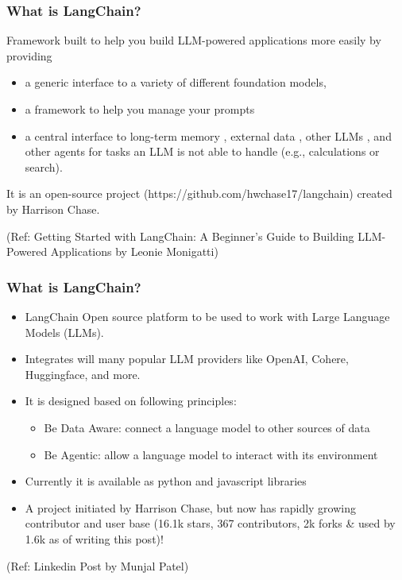 \begin{frame}[fragile]\frametitle{What is LangChain?}

Framework built to help you build LLM-powered applications more easily by providing 

\begin{itemize}
\item a generic interface to a variety of different foundation models,
\item a framework to help you manage your prompts 
\item a central interface to long-term memory , external data , other LLMs , and other agents for tasks an LLM is not able to handle (e.g., calculations or search).
\end{itemize}

It is an open-source project (https://github.com/hwchase17/langchain) created by Harrison Chase.

{\tiny (Ref: Getting Started with LangChain: A Beginner’s Guide to Building LLM-Powered Applications by Leonie Monigatti)}
\end{frame}



\begin{frame}\frametitle{What is LangChain?}

\begin{itemize}
\item LangChain Open source platform to be used to work with Large Language Models (LLMs). 
\item Integrates will many popular LLM providers like OpenAI, Cohere, Huggingface, and more.  
\item It is designed based on following principles:
	\begin{itemize}
	\item Be Data Aware: connect a language model to other sources of data
	\item Be Agentic: allow a language model to interact with its environment
	\end{itemize}
\item Currently it is available as python and javascript libraries
\item A project initiated by Harrison Chase, but now has rapidly growing contributor and user base (16.1k stars, 367 contributors, 2k forks \& used by 1.6k as of writing this post)!
\end{itemize}

{\tiny (Ref: Linkedin Post by Munjal Patel)}
\end{frame}

